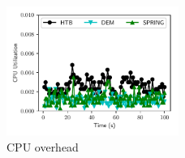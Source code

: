 \begin{figure}[!t]
\centering
\includegraphics[width=0.5\textwidth]{rate_limiter/raw_data/cpu_overhead/figure.pdf}
\caption{CPU overhead}
\label{fig:cpu-overhead}
\end{figure}
